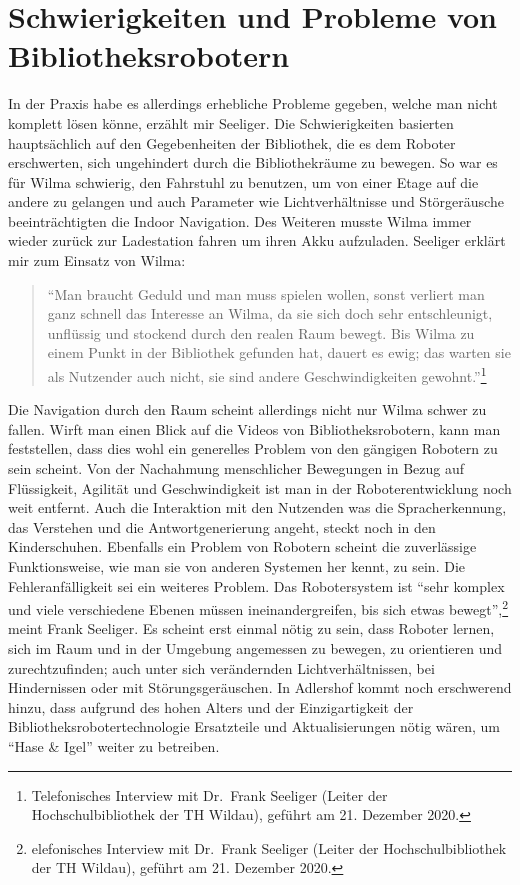 \documentclass[a4paper,
fontsize=11pt,
oneside,
numbers=noperiodatend,
parskip=half-,
bibliography=totoc,
final
]{scrartcl}
\begin{document}
\hypertarget{schwierigkeiten-und-probleme-von-bibliotheksrobotern}{%
\section{Schwierigkeiten und Probleme von
Bibliotheksrobotern}\label{schwierigkeiten-und-probleme-von-bibliotheksrobotern}}

In der Praxis habe es allerdings erhebliche Probleme gegeben, welche man
nicht komplett lösen könne, erzählt mir Seeliger. Die Schwierigkeiten
basierten hauptsächlich auf den Gegebenheiten der Bibliothek, die es dem
Roboter erschwerten, sich ungehindert durch die Bibliothekräume zu
bewegen. So war es für Wilma schwierig, den Fahrstuhl zu benutzen, um
von einer Etage auf die andere zu gelangen und auch Parameter wie
Lichtverhältnisse und Störgeräusche beeinträchtigten die Indoor
Navigation. Des Weiteren musste Wilma immer wieder zurück zur
Ladestation fahren um ihren Akku aufzuladen. Seeliger erklärt mir zum
Einsatz von Wilma:

\begin{quote}
\enquote{Man braucht Geduld und man muss spielen wollen, sonst verliert
man ganz schnell das Interesse an Wilma, da sie sich doch sehr
entschleunigt, unflüssig und stockend durch den realen Raum bewegt. Bis
Wilma zu einem Punkt in der Bibliothek gefunden hat, dauert es ewig; das
warten sie als Nutzender auch nicht, sie sind andere Geschwindigkeiten
gewohnt.}\footnote{Telefonisches Interview mit Dr.~Frank Seeliger
  (Leiter der Hochschulbibliothek der TH Wildau), geführt am 21.
  Dezember 2020.}
\end{quote}

Die Navigation durch den Raum scheint allerdings nicht nur Wilma schwer
zu fallen. Wirft man einen Blick auf die Videos von Bibliotheksrobotern,
kann man feststellen, dass dies wohl ein generelles Problem von den
gängigen Robotern zu sein scheint. Von der Nachahmung menschlicher
Bewegungen in Bezug auf Flüssigkeit, Agilität und Geschwindigkeit ist
man in der Roboterentwicklung noch weit entfernt. Auch die Interaktion
mit den Nutzenden was die Spracherkennung, das Verstehen und die
Antwortgenerierung angeht, steckt noch in den Kinderschuhen. Ebenfalls
ein Problem von Robotern scheint die zuverlässige Funktionsweise, wie
man sie von anderen Systemen her kennt, zu sein. Die Fehleranfälligkeit
sei ein weiteres Problem. Das Robotersystem ist \enquote{sehr komplex
und viele verschiedene Ebenen müssen ineinandergreifen, bis sich etwas
bewegt},\footnote{elefonisches Interview mit Dr.~Frank Seeliger
  (Leiter der Hochschulbibliothek der TH Wildau), geführt am 21.
  Dezember 2020.} meint Frank Seeliger. Es scheint erst einmal
nötig zu sein, dass Roboter lernen, sich im Raum und in der Umgebung
angemessen zu bewegen, zu orientieren und zurechtzufinden; auch unter
sich verändernden Lichtverhältnissen, bei Hindernissen oder mit
Störungsgeräuschen. In Adlershof kommt noch erschwerend hinzu, dass
aufgrund des hohen Alters und der Einzigartigkeit der
Bibliotheksrobotertechnologie Ersatzteile und Aktualisierungen nötig
wären, um \enquote{Hase \& Igel} weiter zu betreiben.
\end{document}
